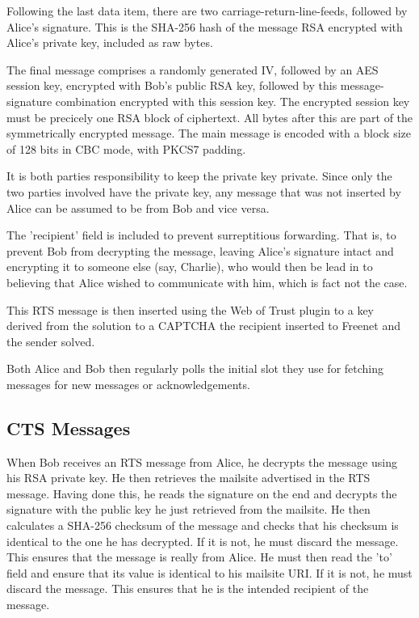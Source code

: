 \documentclass[12pt,a4paper]{article}
\begin{document}
Following the last data item, there are two carriage-return-line-feeds, followed by Alice's
signature. This is the SHA-256 hash of the message RSA encrypted with Alice's private key, included
as raw bytes.

The final message comprises a randomly generated IV, followed by an AES session key, encrypted with
Bob's public RSA key, followed by this message-signature combination encrypted with this session
key. The encrypted session key must be precicely one RSA block of ciphertext. All bytes after this
are part of the symmetrically encrypted message. The main message is encoded with a block size of
128 bits in CBC mode, with PKCS7 padding.

It is both parties responsibility to keep the private key private. Since only the two parties
involved have the private key, any message that was not inserted by Alice can be assumed to be from
Bob and vice versa.

The 'recipient' field is included to prevent surreptitious forwarding. That is, to prevent Bob from
decrypting the message, leaving Alice's signature intact and encrypting it to someone else (say,
Charlie), who would then be lead in to believing that Alice wished to communicate with him, which is
fact not the case.

This RTS message is then inserted using the Web of Trust plugin to a key derived from the solution
to a CAPTCHA the recipient inserted to Freenet and the sender solved.

Both Alice and Bob then regularly polls the initial slot they use for fetching messages for new
messages or acknowledgements.

\subsection{CTS Messages}
When Bob receives an RTS message from Alice, he decrypts the message using his RSA private key. He
then retrieves the mailsite advertised in the RTS message. Having done this, he reads the signature
on the end and decrypts the signature with the public key he just retrieved from the mailsite. He
then calculates a SHA-256 checksum of the message and checks that his checksum is identical to the
one he has decrypted. If it is not, he must discard the message. This ensures that the message is
really from Alice. He must then read the 'to' field and ensure that its value is identical to his
mailsite URI. If it is not, he must discard the message. This ensures that he is the intended
recipient of the message.
\end{document}
